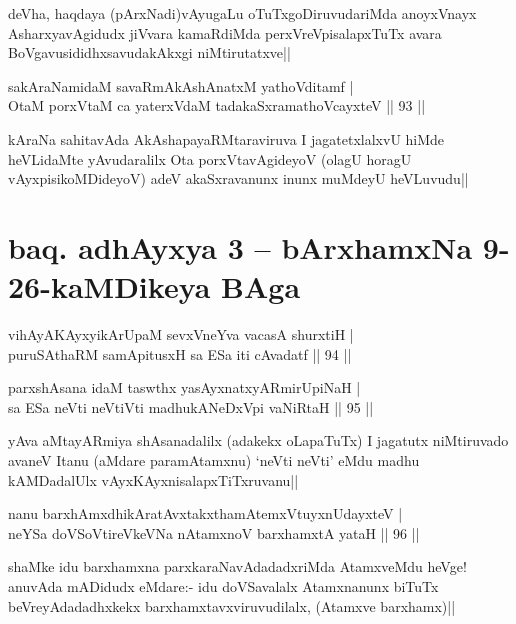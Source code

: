 \begin{artha}%
deVha, haqdaya (pArxNadi)vAyugaLu oTuTxgoDiruvudariMda anoyxVnayx AsharxyavAgidudx jiVvara kamaRdiMda perxVreVpisalapxTuTx avara BoVgavusididhxsavudakAkxgi niMtirutatxve||
\end{artha}

\begin{shl}
sakAraNamidaM savaRmAkAshAnatxM yathoVditamf |\\
OtaM porxVtaM ca yaterxVdaM tadakaSxramathoVcayxteV \hfill || 93 ||
\end{shl}

\begin{artha}
kAraNa sahitavAda AkAshapayaRMtaraviruva I jagatetxlalxvU hiMde heVLidaMte yAvudaralilx Ota porxVtavAgideyoV (olagU horagU vAyxpisikoMDideyoV) adeV akaSxravanunx inunx muMdeyU heVLuvudu||
\end{artha}

\section*{baq. adhAyxya 3 -- bArxhamxNa 9-26-kaMDikeya BAga}



\begin{shl}
vihAyA\s \s KAyxyikArUpaM sevxVneYva vacasA shurxtiH |\\
puruSAthaRM samApitusxH sa ESa iti cAvadatf \hfill || 94 ||
\end{shl}

\begin{shl}
parxshAsana idaM taswthx yasAyxnatxyARmirUpiNaH |\\
sa ESa neVti neVtiVti madhukANeDxV\s pi vaNiRtaH \hfill || 95 ||
\end{shl}

\begin{artha}
yAva aMtayARmiya shAsanadalilx (adakekx oLapaTuTx) I jagatutx niMtiruvado avaneV Itanu (aMdare paramAtamxnu) `neVti neVti' eMdu madhu kAMDadalUlx vAyxKAyxnisalapxTiTxruvanu||
\end{artha}

\begin{shl}
nanu barxhAmxdhikAratAvxtakxthamAtemxVtuyxnUdayxteV |\\
neYSa doVSoV\s tireVkeVNa nA\s \s tamxnoV barxhamxtA yataH \hfill || 96 ||
\end{shl}

\begin{artha}%
shaMke idu barxhamxna parxkaraNavAdadadxriMda AtamxveMdu heVge! anuvAda mADidudx eMdare:- idu doVSavalalx Atamxnanunx biTuTx beVreyAdadadhxkekx barxhamxtavxviruvudilalx, (Atamxve barxhamx)||
\end{artha}

